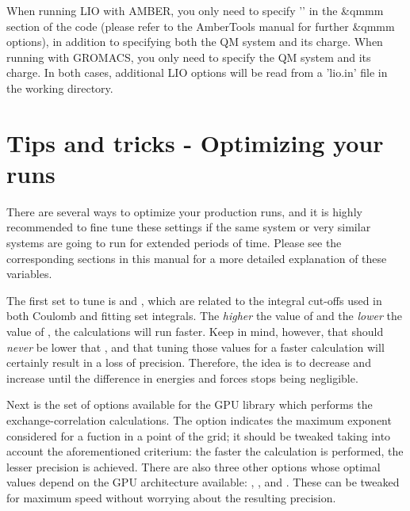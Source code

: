 When running LIO with AMBER, you only need to specify 
'' in the \&qmmm section of the code (please
refer to the AmberTools manual for further \&qmmm options), in addition to 
specifying both the QM system and its charge. When running with GROMACS, you
only need to specify the QM system and its charge. In both cases, additional
LIO options will be read from a '\textcolor{liopurple}{lio.in}' file in the
working directory.

\section{Tips and tricks - Optimizing your runs}
There are several ways to optimize your production runs, and it is highly
recommended to fine tune these settings if the same system or very similar
systems are going to run for extended periods of time. Please see the
corresponding sections in this manual for a more detailed explanation of
these variables.

The first set to tune is  and , which are
related to the integral cut-offs used in both Coulomb and fitting set
integrals. The \textit{higher} the value of  and the
\textit{lower} the value of , the calculations will run
faster. Keep in mind, however, that  should \textit{never} be
lower that , and that tuning those values for a faster
calculation will certainly result in a loss of precision. Therefore, the idea
is to decrease   and increase  until the
difference in energies and forces stops being negligible.

Next is the set of options available for the GPU library which performs the
exchange-correlation calculations. The option 
indicates the maximum exponent considered for a fuction in a point of the grid;
it should be tweaked taking into account the aforementioned criterium: the
faster the calculation is performed, the lesser precision is achieved. 
There are also three other options whose optimal values depend on the GPU
architecture available: , 
, and . These
can be tweaked for maximum speed without worrying about the resulting
precision.


